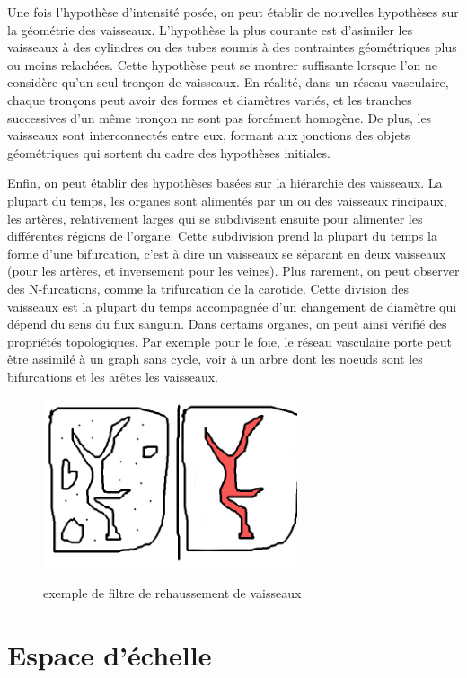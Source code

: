 Une fois l'hypothèse d'intensité posée, on peut établir de nouvelles hypothèses sur la géométrie des vaisseaux. L'hypothèse la plus courante est d'asimiler les vaisseaux à des cylindres ou des tubes soumis à des contraintes géométriques plus ou moins relachées. Cette hypothèse peut se montrer suffisante lorsque l'on ne considère qu'un seul tronçon de vaisseaux. En réalité, dans un réseau vasculaire, chaque tronçons peut avoir des formes et diamètres variés, et les tranches successives d'un même tronçon ne sont pas forcément homogène. De plus, les vaisseaux sont interconnectés entre eux, formant aux jonctions des objets géométriques qui sortent du cadre des hypothèses initiales.

Enfin, on peut établir des hypothèses basées sur la hiérarchie des vaisseaux. La plupart du temps, les organes sont alimentés par un ou des vaisseaux rincipaux, les artères, relativement larges qui se subdivisent ensuite pour alimenter les différentes régions de l'organe. Cette subdivision prend la plupart du temps la forme d'une bifurcation, c'est à dire un vaisseaux se séparant en deux vaisseaux (pour les artères, et inversement pour les veines). Plus rarement, on peut observer des N-furcations, comme la trifurcation de la carotide. Cette division des vaisseaux est la plupart du temps accompagnée d'un changement de diamètre qui dépend du sens du flux sanguin. Dans certains organes, on peut ainsi vérifié des propriétés topologiques. Par exemple pour le foie, le réseau vasculaire porte peut être assimilé à un graph sans cycle, voir à un arbre dont les noeuds sont les bifurcations et les arêtes les vaisseaux.

\begin{figure}
  \centering
  \includegraphics[height=5cm]{Images/example_enhancement.png}
  \label{fig:exemple_vesselness}
  \caption{exemple de filtre de rehaussement de vaisseaux}
\end{figure}

\section{Espace d'échelle}
\label{sec:EA:rehaussement:echelle}


